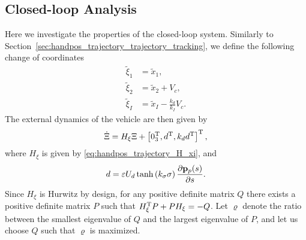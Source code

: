 \subsection{Closed-loop Analysis}
Here we investigate the properties of the closed-loop system.
Similarly to Section~\ref{sec:handpos_trajectory_trajectory_tracking}, we define the following change of coordinates
\begin{subequations}
    \begin{align}
        \tilde{\xi}_1 &= \tilde{x}_1, \\
        \tilde{\xi}_2 &= \tilde{x}_2 + V_c, \\
        \tilde{\xi}_I &= \tilde{x}_I - \frac{k_d}{k_I}V_c.
    \end{align} \label{eq:handpos_trajectory_hand_transform_CL_path}
\end{subequations}
The external dynamics of the vehicle are then given by
\begin{equation}
    \dot{\Xi} = H_{\xi}\Xi + \left[0_3^{\mathrm{T}}, d^{\mathrm{T}}, k_d d^{\mathrm{T}}\right]^{\mathrm{T}}, \label{eq:handpos_trajectory_external_dynamics_path}
\end{equation}
where $H_{\xi}$ is given by \eqref{eq:handpos_trajectory_H_xi}, and
\begin{equation}
    d = \varepsilon U_d \tanh\left(k_{\sigma}\sigma\right) \frac{\partial \mathbf{p}_p(s)}{\partial s}. \label{eq:handpos_trajectory_external_perturbation}
\end{equation}
Since $H_{\xi}$ is Hurwitz by design, for any positive definite matrix $Q$ there exists a positive definite matrix $P$ such that $H_{\xi}^{\mathrm{T}} P + P H_{\xi} = -Q$.
Let $\varrho$ denote the ratio between the smallest eigenvalue of $Q$ and the largest eigenvalue of $P$, and let us choose $Q$ such that $\varrho$ is maximized.

